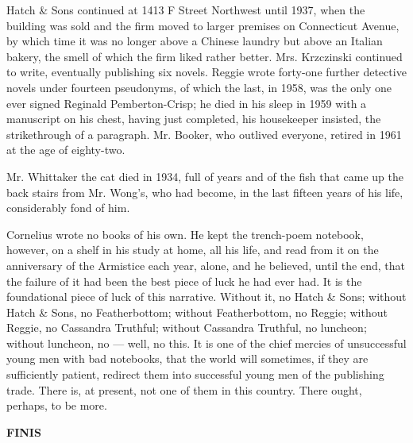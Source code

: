 \documentclass[12pt,openright]{book}
\begin{document}
Hatch \& Sons continued at 1413 F Street Northwest until 1937, when the building was sold and the firm moved to larger premises on Connecticut Avenue, by which time it was no longer above a Chinese laundry but above an Italian bakery, the smell of which the firm liked rather better. Mrs. Krzczinski continued to write, eventually publishing six novels. Reggie wrote forty-one further detective novels under fourteen pseudonyms, of which the last, in 1958, was the only one ever signed Reginald Pemberton-Crisp; he died in his sleep in 1959 with a manuscript on his chest, having just completed, his housekeeper insisted, the strikethrough of a paragraph. Mr. Booker, who outlived everyone, retired in 1961 at the age of eighty-two.

Mr. Whittaker the cat died in 1934, full of years and of the fish that came up the back stairs from Mr. Wong’s, who had become, in the last fifteen years of his life, considerably fond of him.

Cornelius wrote no books of his own. He kept the trench-poem notebook, however, on a shelf in his study at home, all his life, and read from it on the anniversary of the Armistice each year, alone, and he believed, until the end, that the failure of it had been the best piece of luck he had ever had. It is the foundational piece of luck of this narrative. Without it, no Hatch \& Sons; without Hatch \& Sons, no Featherbottom; without Featherbottom, no Reggie; without Reggie, no Cassandra Truthful; without Cassandra Truthful, no luncheon; without luncheon, no — well, no this. It is one of the chief mercies of unsuccessful young men with bad notebooks, that the world will sometimes, if they are sufficiently patient, redirect them into successful young men of the publishing trade. There is, at present, not one of them in this country. There ought, perhaps, to be more.

\textbf{FINIS}



\backmatter

\end{document}

